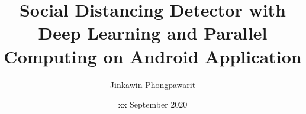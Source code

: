 \documentclass{mproj}
\begin{document}
\title{Social Distancing Detector with Deep Learning and Parallel Computing on Android Application}
\author{Jinkawin Phongpawarit}
\date{xx September 2020}
\maketitle




\educationalconsent


\newpage


\tableofcontents












\appendix %






\end{document}
